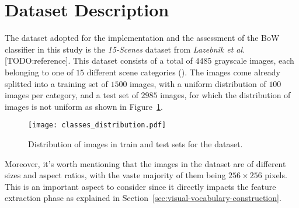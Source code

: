 \documentclass[../main.tex]{subfiles}
\begin{document}
\section{Dataset Description}\label{sec:dataset-description}

The dataset adopted for the implementation and the assessment of the BoW classifier in this study is the \textit{15-Scenes} dataset from \textit{Lazebnik et al.} [TODO:reference]. This dataset consists of a total of $4485$ grayscale images, each belonging to one of $15$ different scene categories (). The images come already splitted into a training set of $1500$ images, with a uniform distribution of $100$ images per category, and a test set of $2985$ images, for which the distribution of images is not uniform as shown in Figure~\ref{fig:dataset-distribution}.

\begin{figure}[H]
  \centering
  \texttt{[image: classes\_distribution.pdf]}
  \caption{Distribution of images in train and test sets for the  dataset.}
  \label{fig:dataset-distribution}
\end{figure}

Moreover, it's worth mentioning that the images in the dataset are of different sizes and aspect ratios, with the vaste majority of them being $256 \times 256$ pixels. This is an important aspect to consider since it directly impacts the feature extraction phase as explained in Section~\ref{sec:visual-vocabulary-construction}.
\end{document}
